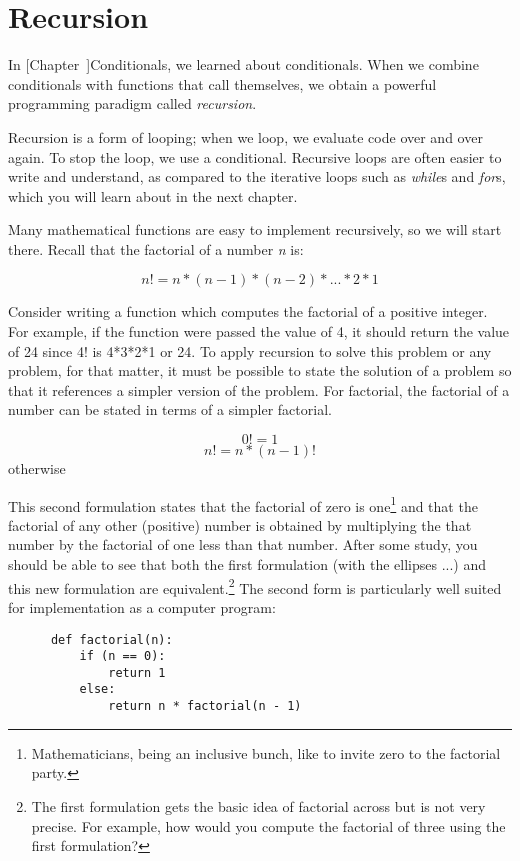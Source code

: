 \chapter{Recursion}
\label{Recursion}

In 
[Chapter~\Ref]{Conditionals},
we learned about conditionals.
When we combine conditionals with functions that call
themselves, we obtain a powerful programming paradigm
called {\it recursion}.

Recursion is a form of looping; when we loop,
we evaluate code over and over again. To stop the loop,
we use a conditional.
Recursive loops are often
easier to write and understand, as compared to the iterative loops
such as {\it while}s and {\it for}s, which you will learn
about in the next chapter.

Many mathematical functions are easy to implement recursively, so
we will start there. Recall that the factorial of a number
{\it n} is:

    \[ n! = n * (n - 1) * (n - 2) * ... * 2 * 1 \]

Consider writing a function which computes the factorial of a positive
integer. For example, if the function were passed the value of 4, it
should return the value of 24 since 4! is 4*3*2*1 or 24.
To apply
recursion to solve this problem or any problem, for that matter,
it must be possible to state the solution
of a problem so that it references a simpler version
of the problem. For factorial, the factorial of a
number can be stated in terms of a simpler factorial.

    \[ 0! = 1 \]
    \[ n! = n * (n - 1)! \] otherwise

This second formulation states that the factorial of zero is one\footnote{
Mathematicians, being an inclusive bunch, like to invite
zero to the factorial party.
}
and that the factorial of any other (positive) number is obtained by
multiplying the that number by the factorial of one less than that
number. After some study, you should be able to see that both
the first formulation (with the ellipses ...) and this new
formulation are equivalent.\footnote{
The first formulation gets the basic idea of factorial
across but is not very precise. For example, how would you compute
the factorial of three using the first formulation?
}
The second form is particularly well suited for implementation
as a computer program:

\begin{verbatim}
      def factorial(n):
          if (n == 0):
              return 1
          else:
              return n * factorial(n - 1)
\end{verbatim}

